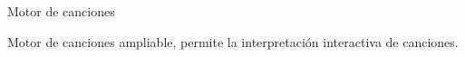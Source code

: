 {\begin{frame}{Motor de canciones}
\begin{center}
    \medskip

    Motor de canciones ampliable, permite la interpretación interactiva de canciones.
  \end{center}

\end{frame}
}

